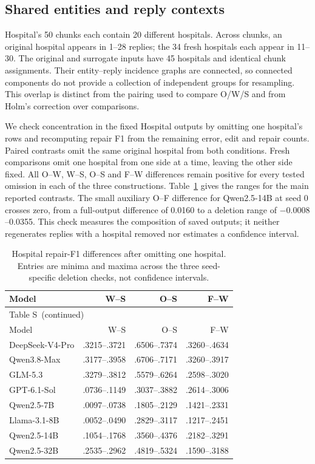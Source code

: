 \documentclass[10pt,a4paper]{article}
\renewcommand{\thetable}{S\arabic{table}}
\begin{document}
\subsection{Shared entities and reply contexts}\label{report-dependence}

Hospital's 50 chunks each contain 20 different hospitals. Across chunks, an original hospital
appears in 1--28 replies; the 34 fresh hospitals each appear in 11--30. The original and
surrogate inputs have 45 hospitals and identical chunk assignments. Their entity--reply
incidence graphs are connected, so connected components do not provide a collection of
independent groups for resampling. This overlap is distinct from the pairing used to compare
O/W/S and from Holm's correction over comparisons.

We check concentration in the fixed Hospital outputs by omitting one hospital's rows and
recomputing repair F1 from the remaining error, edit and repair counts. Paired contrasts omit
the same original hospital from both conditions. Fresh comparisons omit one hospital from
one side at a time, leaving the other side fixed. All O--W, W--S, O--S and F--W differences
remain positive for every tested omission in each of the three constructions. Table~\ref{report-deletion}
gives the ranges for the main reported contrasts. The small auxiliary O--F difference for
Qwen2.5-14B at seed 0 crosses zero, from a full-output difference of 0.0160 to a deletion
range of $-0.0008$--0.0355. This check measures the composition of saved outputs; it neither
regenerates replies with a hospital removed nor estimates a confidence interval.

\begingroup\small\setlength{\tabcolsep}{6pt}
\begin{longtable}{@{}lrrr@{}}
\caption{Hospital repair-F1 differences after omitting one hospital. Entries are minima and
maxima across the three seed-specific deletion checks, not confidence intervals.}
\label{report-deletion}\\
\toprule
Model & W--S & O--S & F--W \\
\midrule
\endfirsthead
\multicolumn{4}{l}{\small Table \thetable\ (continued)}\\
\toprule Model & W--S & O--S & F--W \\
\midrule\endhead
\bottomrule\endlastfoot
DeepSeek-V4-Pro & .3215--.3721 & .6506--.7374 & .3260--.4634 \\
Qwen3.8-Max & .3177--.3958 & .6706--.7171 & .3260--.3917 \\
GLM-5.3 & .3279--.3812 & .5579--.6264 & .2598--.3020 \\
GPT-6.1-Sol & .0736--.1149 & .3037--.3882 & .2614--.3006 \\
Qwen2.5-7B & .0097--.0738 & .1805--.2129 & .1421--.2331 \\
Llama-3.1-8B & .0052--.0490 & .2829--.3117 & .1217--.2451 \\
Qwen2.5-14B & .1054--.1768 & .3560--.4376 & .2182--.3291 \\
Qwen2.5-32B & .2535--.2962 & .4819--.5324 & .1590--.3188 \\
\end{longtable}\endgroup
\end{document}
